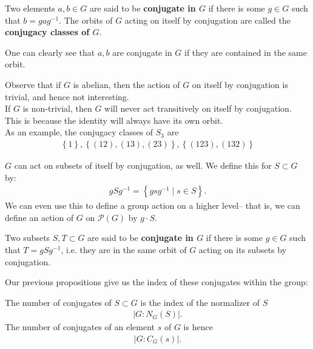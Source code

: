 \documentclass{memoir}
\begin{document}
\begin{defn}[Conjugates]
	Two elements \(a,b \in G\) are said to be \textbf{conjugate in \(G\)} if there is some \(g \in G\) such that \(b = gag^{-1}\). The orbits of \(G\) acting on itself by conjugation are called the \textbf{conjugacy classes of \(G\)}.
\end{defn}
One can clearly see that \(a,b\) are conjugate in \(G\) if they are contained in the same orbit.

\begin{exmp}
	Observe that if \(G\) is abelian, then the action of \(G\) on itself by conjugation is trivial, and hence not interesting.\\

If \(G\) is non-trivial, then \(G\) will never act transitively on itself by conjugation. This is because the identity will always have its own orbit.\\

As an example, the conjugacy classes of \(S_3\) are
\begin{align*}
	\left\{ 1 \right\} , \left\{ (12),(13),(23) \right\} , \left\{ (123),(132) \right\} 
\end{align*}
\end{exmp}

\(G\) can act on subsets of itself by conjugation, as well. We define this for \(S\subset G\) by:
\begin{align*}
	gSg^{-1} = \left\{gsg^{-1} \mid s \in S \right\} .
\end{align*}
We can even use this to define a group action on a higher level-- that is, we can define an action of \(G\) on \(\mathcal{P}(G)\) by \(g\cdot S\).

\begin{defn}
	Two subsets \(S,T \subset G\) are said to be \textbf{conjugate in \(G\)} if there is some \(g \in G\) such that \(T = gSg^{-1}\), i.e. they are in the same orbit of \(G\) acting on its subsets by conjugation.
\end{defn}

Our previous propositions give us the index of these conjugates within the group:
\begin{prop}
	The number of conjugates of \(S\subset G\) is the index of the normalizer of \(S\) 
	\begin{align*}
		\left| G : N_G(S) \right| .
	\end{align*}
	The number of conjugates of an element \(s\) of \(G\) is hence
	\begin{align*}
		\left| G:C_G(s) \right| .
	\end{align*}
\end{prop}
\end{document}
